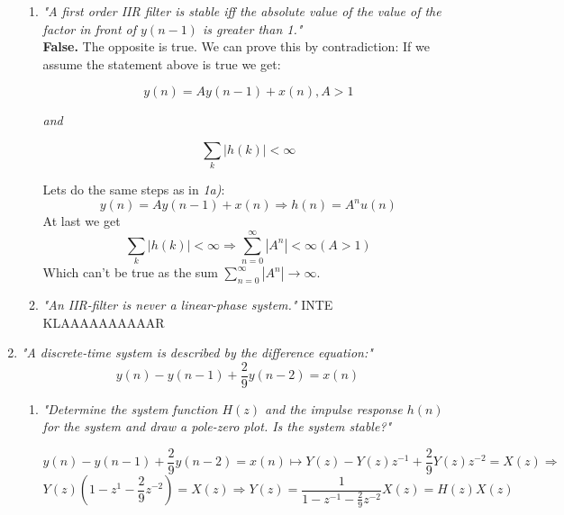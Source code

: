 \documentclass{article}
\begin{document}
\begin{enumerate}
\begin{enumerate}
            \item %
                \emph{"A first order IIR filter is stable iff the absolute value of the value of the factor in front of $y(n-1)$ is greater than 1."}
                \\
                \textbf{False.} The opposite is true. We can prove this by contradiction: If we assume the statement above is true we get:
                
                $$
                    y(n) = Ay(n-1) + x(n), A > 1
                $$
                \begin{center}
                    \textit{and}
                \end{center}
                $$
                   \sum_k |h(k)| < \infty
                $$
                
                Lets do the same steps as in \emph{1a)}:
                $$
                   y(n) = Ay(n-1) + x(n) \Rightarrow h(n) = A^nu(n)
                $$
                At last we get
                $$
                  \sum_k |h(k)| < \infty \Rightarrow \sum_{n=0}^{\infty}|A^n| < \infty  (A > 1)
                $$
                Which can't be true as the sum $\sum_{n=0}^{\infty}|A^n| \rightarrow \infty$.
                
            \item %
                \emph{"An IIR-filter is never a linear-phase system."}
                INTE KLAAAAAAAAAAR
                
                
        \end{enumerate} %
    \item
        \emph{"A discrete-time system is described by the difference equation:"}
        $$
            y(n)-y(n-1) + \frac{2}{9}y(n-2) = x(n)
        $$
        \begin{enumerate}
            \item %
                \emph{"Determine the system function $H(z)$ and the impulse response $h(n)$ for the system and draw a pole-zero plot. Is the system stable?"}
                
                $$
                    y(n)-y(n-1) + \frac{2}{9}y(n-2) = x(n) \longmapsto 
                    Y(z) - Y(z)z^{-1} + \frac{2}{9} Y(z)z^{-2} = X(z) \Rightarrow
                $$$$
                    Y(z)(1 - z^{1} - \frac{2}{9} z^{-2}) = X(z) \Rightarrow
                    Y(z) = \frac{1}{1 - z^{-1} - \frac{2}{9}z^{-2}} X(z) = H(z)X(z)
                $$
                

\end{enumerate}
\end{enumerate}
\end{document}

